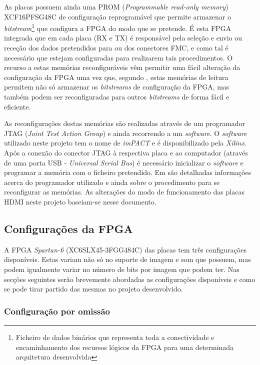 As placas possuem ainda uma PROM (\textit{Programmable read-only memory}) XCF16PFSG48C de configuração reprogramável que permite armazenar o \textit{bitstream}\footnote{Ficheiro de dados binários que representa toda a conectividade e encaminhamento dos recursos lógicos da FPGA para uma determinada arquitetura desenvolvida} que configura a FPGA do modo que se pretende. É esta FPGA integrada que em cada placa (RX e TX) é responsável pela seleção e envio ou receção dos dados pretendidos para ou dos conectores FMC, e como tal é necessário que estejam configuradas para realizarem tais procedimentos. O recurso a estas memórias reconfiguráveis vêm permitir uma fácil alteração da configuração da FPGA uma vez que, segundo \cite{R026}, estas memórias de leitura permitem não só armazenar os \textit{bitstreams} de configuração da FPGA, mas também podem ser reconfiguradas para outros \textit{bitstreams} de forma fácil e eficiente.

As reconfigurações destas memórias são realizadas através de um programador JTAG (\textit{Joint Test Action Group}) e ainda recorrendo a um \textit{software}. O \textit{software} utilizado neste projeto tem o nome de \textit{imPACT} e é disponibilizado pela \textit{Xilinx}. Após a conexão do conector JTAG à respectiva placa e ao computador (através de uma porta USB - \textit{Universal Serial Bus}) é necessário inicializar o \textit{software} e programar a memória com o ficheiro pretendido. Em \cite{R025} são detalhadas informações acerca do programador utilizado e ainda sobre o procedimento para se reconfigurar as memórias. As alterações do modo de funcionamento das placas HDMI neste projeto baseiam-se nesse documento.

\subsection{Configurações da FPGA} \label{subsec:HDMIconfig}

A FPGA \textit{Spartan-6} (XC6SLX45-3FGG484C) das placas tem três configurações disponíveis. Estas variam não só no suporte de imagem e som que possuem, mas podem igualmente variar no número de bits por imagem que podem ter. Nas secções seguintes serão brevemente abordadas as configurações disponíveis e como se pode tirar partido das mesmas no projeto desenvolvido.

\subsubsection{Configuração por omissão} \label{subsubsec:HDMIconfigdefault}

